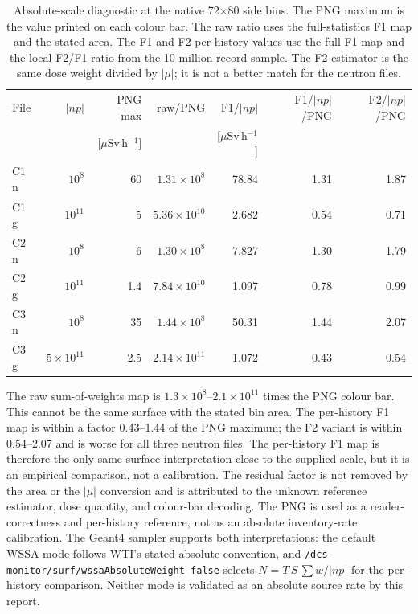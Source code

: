 \documentclass[11pt,a4paper]{article}
\begin{document}
\begin{table}[H]
\centering
\caption{Absolute-scale diagnostic at the native 72$\times$80 side bins.
The PNG maximum is the value printed on each colour bar.  The raw ratio uses
the full-statistics F1 map and the stated area.  The F1 and F2 per-history
values use the full F1 map and the local F2/F1 ratio from the 10-million-record
sample.  The F2 estimator is the same dose weight divided by $|\mu|$; it is not
a better match for the neutron files.}
\label{tab:absolute_scale}
\footnotesize
\begin{tabular}{@{}l r r r r r r@{}}
\toprule
File & $|np|$ & PNG max & raw/PNG & F1/$|np|$ & F1/$|np|$/PNG & F2/$|np|$/PNG \\
     &        & [$\mu$Sv\,h$^{-1}$] & & [$\mu$Sv\,h$^{-1}$] & & \\
\midrule
C1 n & $10^{8}$  & 60  & $1.31\times10^{8}$  & 78.84  & 1.31 & 1.87 \\
C1 g & $10^{11}$ & 5   & $5.36\times10^{10}$ & 2.682  & 0.54 & 0.71 \\
C2 n & $10^{8}$  & 6   & $1.30\times10^{8}$  & 7.827  & 1.30 & 1.79 \\
C2 g & $10^{11}$ & 1.4 & $7.84\times10^{10}$ & 1.097  & 0.78 & 0.99 \\
C3 n & $10^{8}$  & 35  & $1.44\times10^{8}$  & 50.31  & 1.44 & 2.07 \\
C3 g & $5\times10^{11}$ & 2.5 & $2.14\times10^{11}$ & 1.072 & 0.43 & 0.54 \\
\bottomrule
\end{tabular}
\end{table}

The raw sum-of-weights map is $1.3\times10^{8}$--$2.1\times10^{11}$ times the
PNG colour bar.  This cannot be the same surface with the stated bin area.  The
per-history F1 map is within a factor 0.43--1.44 of the PNG maximum; the F2
variant is within 0.54--2.07 and is worse for all three neutron files.  The
per-history F1 map is therefore the only same-surface interpretation close to
the supplied scale, but it is an empirical comparison, not a calibration.  The
residual factor is not removed by the area or the $|\mu|$ conversion and is
attributed to the unknown reference estimator, dose quantity, and colour-bar
decoding.  The PNG is used as a reader-correctness and per-history reference,
not as an absolute inventory-rate calibration.  The Geant4 sampler supports
both interpretations: the default WSSA mode follows WTI's stated absolute
convention, and \texttt{/dcs-monitor/surf/wssaAbsoluteWeight false} selects
$N=T\,S\,\sum w/|np|$ for the per-history comparison.  Neither mode is
validated as an absolute source rate by this report.
\end{document}
